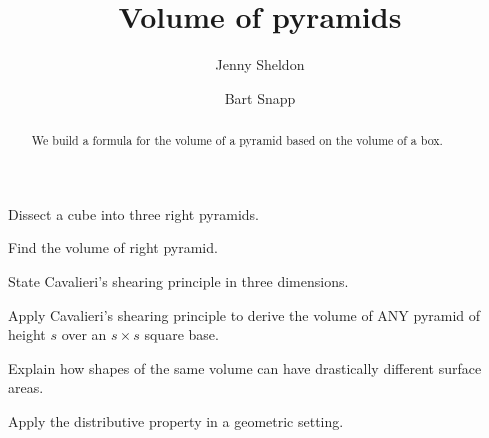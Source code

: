 \documentclass[nooutcomes,noauthor,handout,hints,12pt]{ximera}
\title{Volume of pyramids}
\author{Jenny Sheldon \and Bart Snapp}
\begin{document}
\begin{abstract}
  We build a formula for the volume of a pyramid based on the volume
  of a box.
\end{abstract}
\maketitle


\begin{listOutcomes}
\item Dissect a cube into three right pyramids.
\item Find the volume of right pyramid.
\item State Cavalieri's shearing principle in three dimensions.
\item Apply Cavalieri's shearing principle to derive the volume of ANY pyramid
  of height $s$ over an $s\times s$ square base.
\item Explain how shapes of the same volume can have drastically
  different surface areas.
\item Apply the distributive property in a geometric setting.
\end{listOutcomes}



\mynewpage
\end{document}
